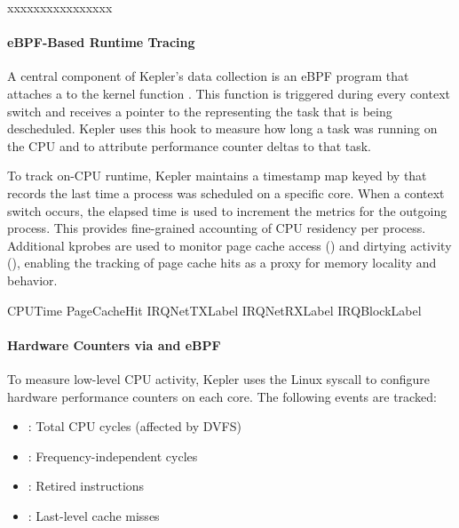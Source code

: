 xxxxxxxxxxxxxxxx

\paragraph{eBPF-Based Runtime Tracing}

A central component of Kepler's data collection is an eBPF program that attaches a  to the kernel function . This function is triggered during every context switch and receives a pointer to the  representing the task that is being descheduled. Kepler uses this hook to measure how long a task was running on the CPU and to attribute performance counter deltas to that task.

To track on-CPU runtime, Kepler maintains a timestamp map keyed by  that records the last time a process was scheduled on a specific core. When a context switch occurs, the elapsed time is used to increment the  metrics for the outgoing process. This provides fine-grained accounting of CPU residency per process. Additional kprobes are used to monitor page cache access () and dirtying activity (), enabling the tracking of page cache hits as a proxy for memory locality and behavior.


CPUTime
PageCacheHit
IRQNetTXLabel
IRQNetRXLabel
IRQBlockLabel





\paragraph{Hardware Counters via  and eBPF}

To measure low-level CPU activity, Kepler uses the Linux syscall  to configure hardware performance counters on each core. The following events are tracked:
\begin{itemize}
  \item {}: Total CPU cycles (affected by DVFS)
  \item {}: Frequency-independent cycles
  \item {}: Retired instructions
  \item {}: Last-level cache misses
\end{itemize}

